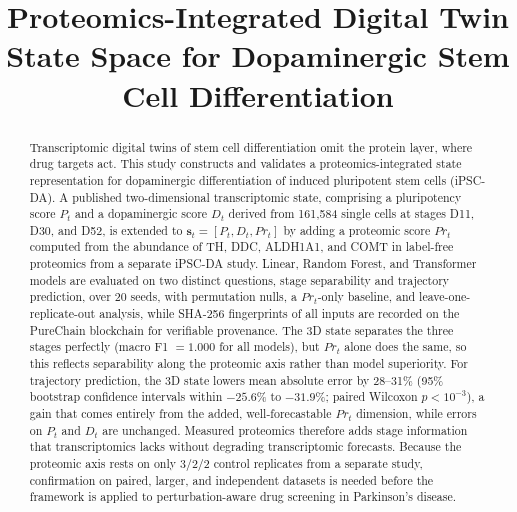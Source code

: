 \documentclass[5p,times,twocolumn]{elsarticle}
\newcommand{\rtag}[1]{}
\begin{document}
\begin{frontmatter}

  \title{Proteomics-Integrated Digital Twin State Space for Dopaminergic Stem Cell Differentiation}


  \begin{abstract}
    \color{black}
    \rtag{R1.1,R2.1,R1.14}Transcriptomic digital twins of stem cell
    differentiation omit the protein layer, where drug targets act.
    This study constructs and validates a proteomics-integrated
    state representation for dopaminergic differentiation of induced
    pluripotent stem cells (iPSC-DA). A published two-dimensional
    transcriptomic state, comprising a pluripotency score $P_{t}$
    and a dopaminergic score $D_{t}$ derived from 161,584 single
    cells at stages D11, D30, and D52, is extended to
    $\mathbf{s}_{t} = [P_{t}, D_{t}, Pr_{t}]$ by adding a proteomic
    score $Pr_{t}$ computed from the abundance of TH, DDC, ALDH1A1,
    and COMT in label-free proteomics from a separate iPSC-DA study.
    Linear, Random Forest, and Transformer models are evaluated on
    two distinct questions, stage separability and trajectory
    prediction, over 20 seeds, with permutation nulls, a
    $Pr_{t}$-only baseline, and leave-one-replicate-out analysis,
    while SHA-256 fingerprints of all inputs are recorded on the
    PureChain blockchain for verifiable provenance.
    \rtag{R1.8,R2.12}The 3D state separates the three stages
    perfectly (macro F1 $= 1.000$ for all models), but $Pr_{t}$
    alone does the same, so this reflects separability along the
    proteomic axis rather than model superiority.
    \rtag{R1.4,R1.9,R2.13}For trajectory prediction, the 3D state
    lowers mean absolute error by 28--31\% (95\% bootstrap
    confidence intervals within $-25.6\%$ to $-31.9\%$; paired
    Wilcoxon $p < 10^{-3}$), a gain that comes entirely from the
    added, well-forecastable $Pr_{t}$ dimension, while errors on
    $P_{t}$ and $D_{t}$ are unchanged.
    \rtag{R1.5,R2.8,R2.20}Measured proteomics therefore adds stage
    information that transcriptomics lacks without degrading
    transcriptomic forecasts. Because the proteomic axis rests on
    only 3/2/2 control replicates from a separate study,
    confirmation on paired, larger, and independent datasets is
    needed before the framework is applied to perturbation-aware
    drug screening in Parkinson's disease.
  \end{abstract}


\end{frontmatter}
\end{document}
